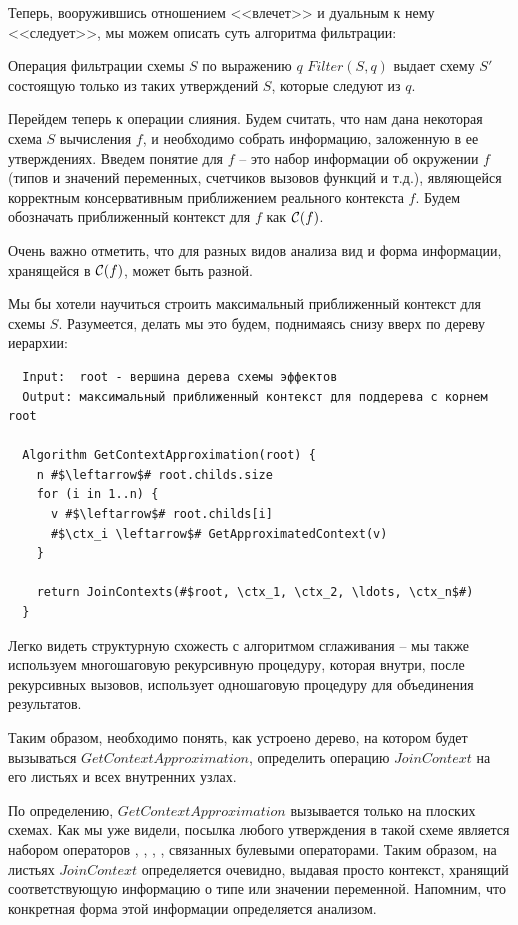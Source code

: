 Теперь, вооружившись отношением <<влечет>> и дуальным к нему <<следует>>, мы можем описать суть алгоритма фильтрации:

\begin{definition}
    Операция фильтрации схемы $S$ по выражению $q$ $Filter(S, q)$ выдает схему $S'$ состоящую только из таких утверждений $S$, которые следуют из $q$.
\end{definition}


\bigskip

Перейдем теперь к операции слияния. Будем считать, что нам дана некоторая схема $S$ вычисления $f$, и необходимо собрать информацию, заложенную в ее утверждениях. Введем понятие  для $f$ -- это набор информации об окружении $f$ (типов и значений переменных, счетчиков вызовов функций и т.д.), являющейся корректным консервативным приближением реального контекста $f$. Будем обозначать приближенный контекст для $f$ как $\mathcal{C}(f)$.

Очень важно отметить, что для разных видов анализа вид и форма информации, хранящейся в $\mathcal{C}(f)$, может быть разной.

Мы бы хотели научиться строить максимальный приближенный контекст для схемы $S$. Разумеется, делать мы это будем, поднимаясь снизу вверх по дереву иерархии:

\begin{verbatim}
  Input:  root - вершина дерева схемы эффектов
  Output: максимальный приближенный контекст для поддерева с корнем root

  Algorithm GetContextApproximation(root) {
    n #$\leftarrow$# root.childs.size
    for (i in 1..n) {
      v #$\leftarrow$# root.childs[i]
      #$\ctx_i \leftarrow$# GetApproximatedContext(v)
    }

    return JoinContexts(#$root, \ctx_1, \ctx_2, \ldots, \ctx_n$#)
  }
\end{verbatim}

Легко видеть структурную схожесть с алгоритмом сглаживания -- мы также используем многошаговую рекурсивную процедуру, которая внутри, после рекурсивных вызовов, использует одношаговую процедуру для объединения результатов.

Таким образом, необходимо понять, как устроено дерево, на котором будет вызываться $GetContextApproximation$, определить операцию $JoinContext$ на его листьях и всех внутренних узлах.

По определению, $GetContextApproximation$ вызывается только на плоских схемах. Как мы уже видели, посылка любого утверждения в такой схеме является набором операторов , \code{==}, , \code{!=}, связанных булевыми операторами. Таким образом, на листьях $JoinContext$ определяется очевидно, выдавая просто контекст, хранящий соответствующую информацию о типе или значении переменной. Напомним, что конкретная форма этой информации определяется анализом.

